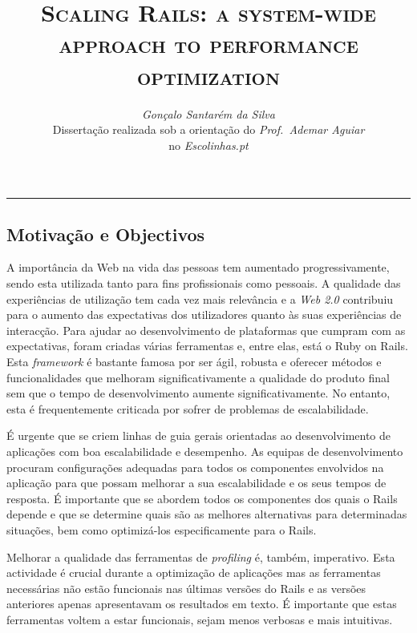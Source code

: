 \documentclass[9pt,a4paper]{extarticle}
\begin{document}
\title{\vspace*{-8mm}\textbf{\textsc{Scaling Rails: a system-wide approach to performance optimization}}}
\author{\emph{Gonçalo Santarém da Silva}\\[2mm]
\small{Dissertação realizada sob a orientação do \emph{Prof.\ Ademar Aguiar}}\\
\small{no \emph{Escolinhas.pt}}}
\date{}
\maketitle
\thispagestyle{empty}

\vspace*{-4mm}\noindent\rule{\textwidth}{0.4pt}\vspace*{4mm}

\begin{multicols}{2}

\section{Motivação e Objectivos}
A importância da Web na vida das pessoas tem aumentado progressivamente, sendo esta utilizada tanto para fins profissionais como pessoais. A qualidade das experiências de utilização tem cada vez mais relevância e a \textit{Web 2.0} contribuiu para o aumento das expectativas dos utilizadores quanto às suas experiências de interacção. Para ajudar ao desenvolvimento de plataformas que cumpram com as expectativas, foram criadas várias ferramentas e, entre elas, está o Ruby on Rails. Esta \textit{framework} é bastante famosa por ser ágil, robusta e oferecer métodos e funcionalidades que melhoram significativamente a qualidade do produto final sem que o tempo de desenvolvimento aumente significativamente. No entanto, esta é frequentemente criticada por sofrer de problemas de escalabilidade.

É urgente que se criem linhas de guia gerais orientadas ao desenvolvimento de aplicações com boa escalabilidade e desempenho. As equipas de desenvolvimento procuram configurações adequadas para todos os componentes envolvidos na aplicação para que possam melhorar a sua escalabilidade e os seus tempos de resposta. É importante que se abordem todos os componentes dos quais o Rails depende e que se determine quais são as melhores alternativas para determinadas situações, bem como optimizá-los especificamente para o Rails.

Melhorar a qualidade das ferramentas de \textit{profiling} é, também, imperativo. Esta actividade é crucial durante a optimização de aplicações mas as ferramentas necessárias não estão funcionais nas últimas versões do Rails e as versões anteriores apenas apresentavam os resultados em texto. É importante que estas ferramentas voltem a estar funcionais, sejam menos verbosas e mais intuitivas.


\end{multicols}
\end{document}
